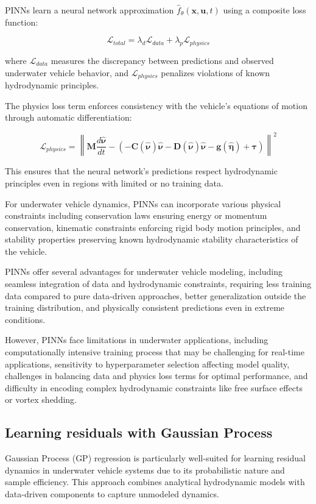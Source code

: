 PINNs learn a neural network approximation $\hat{f}_\theta(\mathbf{x}, \mathbf{u}, t)$ using a composite loss function:

\begin{equation}
\mathcal{L}_{total} = \lambda_d \mathcal{L}_{data} + \lambda_p \mathcal{L}_{physics}
\end{equation}

where $\mathcal{L}_{data}$ measures the discrepancy between predictions and observed underwater vehicle behavior, and $\mathcal{L}_{physics}$ penalizes violations of known hydrodynamic principles.

The physics loss term enforces consistency with the vehicle's equations of motion through automatic differentiation:

\begin{equation}
\mathcal{L}_{physics} = \left\| \mathbf{M}\frac{d\hat{\mathbf{\nu}}}{dt} - \left(-\mathbf{C}(\hat{\mathbf{\nu}})\hat{\mathbf{\nu}} - \mathbf{D}(\hat{\mathbf{\nu}})\hat{\mathbf{\nu}} - \mathbf{g}(\hat{\mathbf{\eta}}) + \mathbf{\tau} \right) \right\|^2
\end{equation}

This ensures that the neural network's predictions respect hydrodynamic principles even in regions with limited or no training data.

For underwater vehicle dynamics, PINNs can incorporate various physical constraints including conservation laws ensuring energy or momentum conservation, kinematic constraints enforcing rigid body motion principles, and stability properties preserving known hydrodynamic stability characteristics of the vehicle.

PINNs offer several advantages for underwater vehicle modeling, including seamless integration of data and hydrodynamic constraints, requiring less training data compared to pure data-driven approaches, better generalization outside the training distribution, and physically consistent predictions even in extreme conditions.

However, PINNs face limitations in underwater applications, including computationally intensive training process that may be challenging for real-time applications, sensitivity to hyperparameter selection affecting model quality, challenges in balancing data and physics loss terms for optimal performance, and difficulty in encoding complex hydrodynamic constraints like free surface effects or vortex shedding.

\subsection{Learning residuals with Gaussian Process}
Gaussian Process (GP) regression is particularly well-suited for learning residual dynamics in underwater vehicle systems due to its probabilistic nature and sample efficiency. This approach combines analytical hydrodynamic models with data-driven components to capture unmodeled dynamics.

